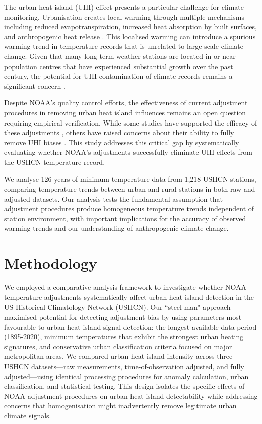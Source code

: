 \documentclass[11pt, a4paper]{article}
\begin{document}
The urban heat island (UHI) effect presents a particular challenge for climate monitoring. Urbanisation creates local warming through multiple mechanisms including reduced evapotranspiration, increased heat absorption by built surfaces, and anthropogenic heat release \parencite{oke1973city,oke1987boundary,landsberg1981urban}. This localised warming can introduce a spurious warming trend in temperature records that is unrelated to large-scale climate change. Given that many long-term weather stations are located in or near population centres that have experienced substantial growth over the past century, the potential for UHI contamination of climate records remains a significant concern \parencite{karl1988urbanization}.

Despite NOAA's quality control efforts, the effectiveness of current adjustment procedures in removing urban heat island influences remains an open question requiring empirical verification. While some studies have supported the efficacy of these adjustments \parencite{hausfather2016evaluating,venema2012benchmarking}, others have raised concerns about their ability to fully remove UHI biases \parencite{fall2011analysis,connolly2021evaluation,spencer2021urban}. This study addresses this critical gap by systematically evaluating whether NOAA's adjustments successfully eliminate UHI effects from the USHCN temperature record. 

We analyse 126 years of minimum temperature data from 1,218 USHCN stations, comparing temperature trends between urban and rural stations in both raw and adjusted datasets. Our analysis tests the fundamental assumption that adjustment procedures produce homogeneous temperature trends independent of station environment, with important implications for the accuracy of observed warming trends and our understanding of anthropogenic climate change.

\section{Methodology}
\label{sec:methods}

We employed a comparative analysis framework to investigate whether NOAA temperature adjustments systematically affect urban heat island detection in the US Historical Climatology Network (USHCN). Our ``steel-man" approach maximised potential for detecting adjustment bias by using parameters most favourable to urban heat island signal detection: the longest available data period (1895-2020), minimum temperatures that exhibit the strongest urban heating signatures, and conservative urban classification criteria focused on major metropolitan areas. We compared urban heat island intensity across three USHCN datasets—raw measurements, time-of-observation adjusted, and fully adjusted—using identical processing procedures for anomaly calculation, urban classification, and statistical testing. This design isolates the specific effects of NOAA adjustment procedures on urban heat island detectability while addressing concerns that homogenisation might inadvertently remove legitimate urban climate signals.
\end{document}
